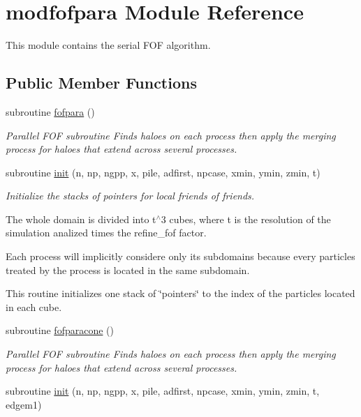\hypertarget{classmodfofpara}{\section{modfofpara Module Reference}
\label{classmodfofpara}
}


This module contains the serial F\-O\-F algorithm.  


\subsection*{Public Member Functions}
\begin{DoxyCompactItemize}
\item 
subroutine \hyperlink{classmodfofpara_a0e76e564f41683dc0c0104fc789718b0}{fofpara} ()
\begin{DoxyCompactList}\small\item\em Parallel F\-O\-F subroutine Finds haloes on each process then apply the merging process for haloes that extend across several processes. \end{DoxyCompactList}\item 
subroutine \hyperlink{classmodfofpara_a5294ecab752fb3cfbea3bec7cd28a29a}{init} (n, np, ngpp, x, pile, adfirst, npcase, xmin, ymin, zmin, t)
\begin{DoxyCompactList}\small\item\em Initialize the stacks of pointers for local friends of friends.\par
 The whole domain is divided into t$^\wedge$3 cubes, where t is the resolution of the simulation analized times the refine\-\_\-fof factor.\par
 Each process will implicitly considere only its subdomains because every particles treated by the process is located in the same subdomain.\par
 This routine initializes one stack of \char`\"{}pointers\char`\"{} to the index of the particles located in each cube. \end{DoxyCompactList}\item 
subroutine \hyperlink{classmodfofpara_a033a2820dd29f107782b566ca298bde4}{fofparacone} ()
\begin{DoxyCompactList}\small\item\em Parallel F\-O\-F subroutine Finds haloes on each process then apply the merging process for haloes that extend across several processes. \end{DoxyCompactList}\item 
subroutine \hyperlink{classmodfofpara_afdd2abc340cad047a13ebbb62f1bafdc}{init} (n, np, ngpp, x, pile, adfirst, npcase, xmin, ymin, zmin, t, edgem1)

\end{DoxyCompactItemize}
